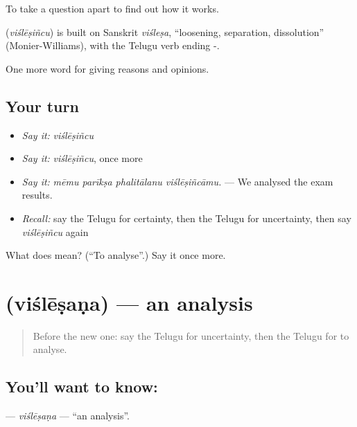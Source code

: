 To take a question apart to find out how it works.

\begin{cousinweb}
\textbf{} (\emph{viślēṣiñcu}) is built on Sanskrit \emph{viśleṣa}, \textquotedblleft{}loosening, separation, dissolution\textquotedblright{} (Monier-Williams), with the Telugu verb ending -.
\end{cousinweb}

\begin{grammarlens}[title={What you've built}]
One more word for giving reasons and opinions.
\end{grammarlens}

\subsection*{Your turn}
\begin{itemize}
\raggedright
  \item \emph{Say it:} \emph{viślēṣiñcu}
  \item \emph{Say it:} \emph{viślēṣiñcu}, once more
  \item \emph{Say it:} \emph{mēmu parīkṣa phalitālanu viślēṣiñcāmu.} — We analysed the exam results.
  \item \emph{Recall:} say the Telugu for certainty, then the Telugu for uncertainty, then say \emph{viślēṣiñcu} again
\end{itemize}

\begin{tcolorbox}[breakable,colback=teal!4,colframe=teal!35!black,title={Before you move on}]
What does  mean? (\textquotedblleft{}To analyse\textquotedblright{}.) Say it once more.
\end{tcolorbox}
\section[\texorpdfstring{\te{విశ్లేషణ} (viślēṣaṇa)}{విశ్లేషణ (viślēṣaṇa)}]{ (viślēṣaṇa) — an analysis}

\label{lesson:TE-C389-vislesana}



\begin{quote}
Before the new one: say the Telugu for uncertainty, then the Telugu for to analyse.
\end{quote}

\subsection*{You'll want to know: }
\textbf{} — \emph{viślēṣaṇa} — \textquotedblleft{}an analysis\textquotedblright{}.


